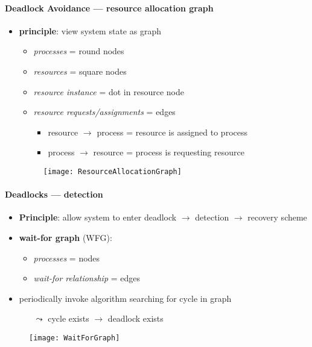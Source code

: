 \paragraph{Deadlock Avoidance --- resource allocation graph}
\begin{itemize}
  \item \textbf{principle}: view system state as graph
  \begin{itemize}
    \item \emph{processes} = round nodes
    \item \emph{resources} = square nodes
    \item \emph{resource instance} = dot in resource node
    \item \emph{resource requests/assignments} = edges
    \begin{itemize}
      \item resource $ \to $ process = resource is assigned to process
      \item process $ \to $ resource = process is requesting resource
    \end{itemize}
  \end{itemize}
  \begin{figure}[h]\centering\label{ResourceAllocationGraph}\texttt{[image: ResourceAllocationGraph]}\end{figure}
\end{itemize}

\paragraph{Deadlocks --- detection}
\begin{itemize}
  \item \textbf{Principle}: allow system to enter deadlock $ \to $ detection $ \to $ recovery scheme
  \item \textbf{wait-for graph} (WFG):
  \begin{itemize}
    \item \emph{processes} = nodes
    \item \emph{wait-for relationship} = edges
  \end{itemize}
  \item periodically invoke algorithm searching for cycle in graph
  \begin{itemize}
    \item[$ \leadsto $] cycle exists $ \to $ deadlock exists
  \end{itemize}
\end{itemize}
\begin{figure}[h]\centering\label{WaitForGraph}\texttt{[image: WaitForGraph]}\end{figure}

